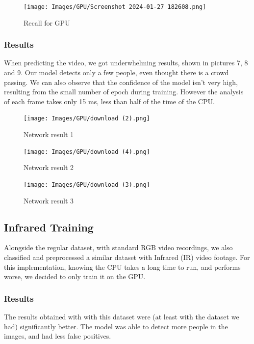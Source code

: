 \documentclass[conference]{IEEEtran}
\begin{document}
\begin{figure}[ht!]
    \centering
    \texttt{[image: Images/GPU/Screenshot 2024-01-27 182608.png]}
    \caption{Recall for GPU}\label{fig:GPUrecall}
\end{figure}

\subsubsection{Results}
When predicting the video, we got underwhelming results, shown in pictures 7, 8 and 9. Our model detects only a few people, even thought there is a crowd passing. We can also observe that the confidence of the model isn't very high, resulting from the small number of epoch during training. However the analysis of each frame takes only 15 ms, less than half of the time of the CPU.

\begin{figure}[ht!]
    \centering
    \texttt{[image: Images/GPU/download (2).png]}
    \caption{Network result 1}\label{NetRes1}
\end{figure}

\begin{figure}[ht!]
    \centering
    \texttt{[image: Images/GPU/download (4).png]}
    \caption{Network result 2}\label{fig:NetRes2}
\end{figure}

\begin{figure}[ht!]
    \centering
    \texttt{[image: Images/GPU/download (3).png]}
    \caption{Network result 3}\label{fig:NetRes3}
\end{figure}

\subsection{Infrared Training}
Alongside the regular dataset, with standard RGB video recordings, we also classified and preprocessed a similar dataset with Infrared (IR) video footage. For this implementation, knowing the CPU takes a long time to run, and performs worse, we decided to only train it on the GPU.

\subsubsection{Results}
The results obtained with with this dataset were (at least with the dataset we had) significantly better. The model was able to detect more people in the images, and had less false positives.
\end{document}

